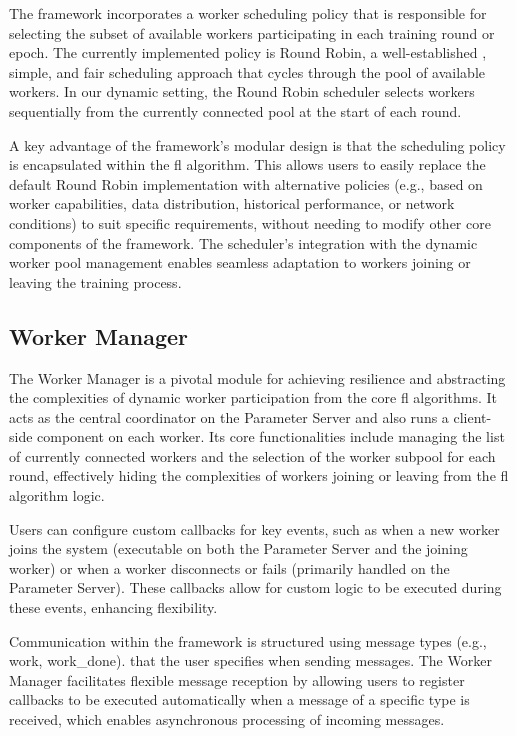The framework incorporates a worker scheduling policy that is responsible for selecting the subset of available workers participating in each training round or epoch. The currently implemented policy is Round Robin, a well-established \cite{rasmussen2008round}, simple, and fair scheduling approach that cycles through the pool of available workers. In our dynamic setting, the Round Robin scheduler selects workers sequentially from the currently connected pool at the start of each round.

A key advantage of the framework's modular design is that the scheduling policy is encapsulated within the \ac{fl} algorithm. This allows users to easily replace the default Round Robin implementation with alternative policies (e.g., based on worker capabilities, data distribution, historical performance, or network conditions) to suit specific requirements, without needing to modify other core components of the framework. The scheduler's integration with the dynamic worker pool management enables seamless adaptation to workers joining or leaving the training process.

\subsection{Worker Manager}
\label{sec:worker-manager}

The Worker Manager is a pivotal module for achieving resilience and abstracting the complexities of dynamic worker participation from the core \ac{fl} algorithms. It acts as the central coordinator on the Parameter Server and also runs a client-side component on each worker. Its core functionalities include managing the list of currently connected workers and the selection of the worker subpool for each round, effectively hiding the complexities of workers joining or leaving from the \ac{fl} algorithm logic. 

Users can configure custom callbacks for key events, such as when a new worker joins the system (executable on both the Parameter Server and the joining worker) or  when a worker disconnects or fails (primarily handled on the Parameter Server). These callbacks allow for custom logic to be executed during these events, enhancing flexibility.

Communication within the framework is structured using message types (e.g., work, work\_done). that the user specifies when sending messages. The Worker Manager facilitates flexible message reception by allowing users to register callbacks to be executed automatically when a message of a specific type is received, which enables asynchronous processing of incoming messages. 

